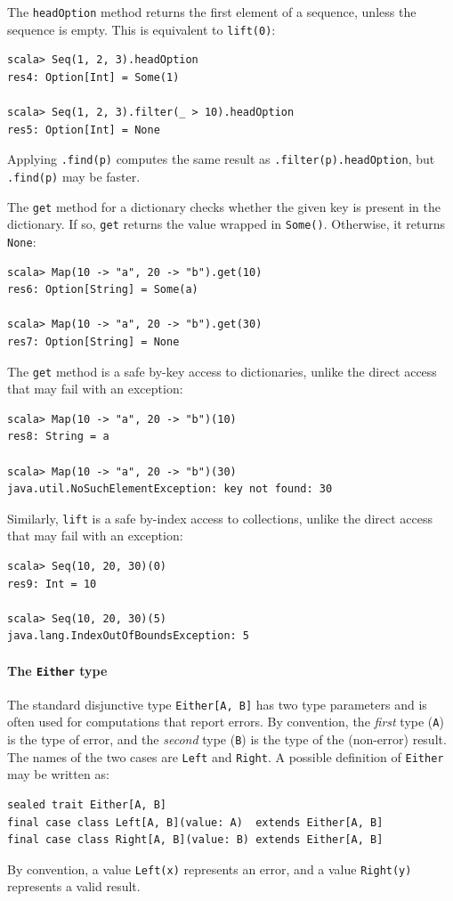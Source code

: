 The \lstinline!headOption! method returns the first element of a
sequence, unless the sequence is empty. This is equivalent to \lstinline!lift(0)!:
\begin{lstlisting}
scala> Seq(1, 2, 3).headOption
res4: Option[Int] = Some(1)

scala> Seq(1, 2, 3).filter(_ > 10).headOption
res5: Option[Int] = None
\end{lstlisting}
Applying \lstinline!.find(p)! computes the same result as \lstinline!.filter(p).headOption!,
but \lstinline!.find(p)! may be faster.

The \lstinline!get! method for a dictionary checks whether the given
key is present in the dictionary. If so, \lstinline!get! returns
the value wrapped in \lstinline!Some()!. Otherwise, it returns \lstinline!None!:
\begin{lstlisting}
scala> Map(10 -> "a", 20 -> "b").get(10)
res6: Option[String] = Some(a)

scala> Map(10 -> "a", 20 -> "b").get(30)
res7: Option[String] = None 
\end{lstlisting}
The \lstinline!get! method is a safe by-key access to dictionaries,
unlike the direct access that may fail with an exception:
\begin{lstlisting}
scala> Map(10 -> "a", 20 -> "b")(10)
res8: String = a 

scala> Map(10 -> "a", 20 -> "b")(30)
java.util.NoSuchElementException: key not found: 30
\end{lstlisting}
Similarly, \lstinline!lift! is a safe by-index access to collections,
unlike the direct access that may fail with an exception:
\begin{lstlisting}
scala> Seq(10, 20, 30)(0)
res9: Int = 10

scala> Seq(10, 20, 30)(5)
java.lang.IndexOutOfBoundsException: 5
\end{lstlisting}


\paragraph{The \texttt{Either} type}

The standard disjunctive type \lstinline!Either[A, B]! has two type
parameters and is often used for computations that report errors.
By convention, the \emph{first} type (\lstinline!A!) is the type
of error, and the \emph{second} type (\lstinline!B!) is the type
of the (non-error) result. The names of the two cases are \lstinline!Left!
and \lstinline!Right!. A possible definition of \lstinline!Either!
may be written as:
\begin{lstlisting}
sealed trait Either[A, B]
final case class Left[A, B](value: A)  extends Either[A, B]
final case class Right[A, B](value: B) extends Either[A, B]
\end{lstlisting}
By convention, a value \lstinline!Left(x)! represents an error, and
a value \lstinline!Right(y)! represents a valid result.

